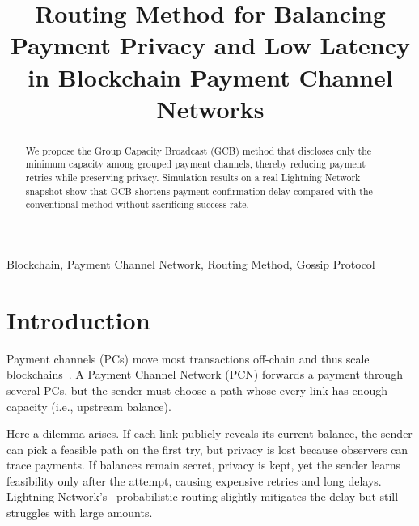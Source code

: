 \documentclass[conference]{IEEEtran}
\begin{document}
\title{Routing Method for Balancing Payment Privacy and Low Latency in Blockchain Payment Channel Networks}

\author{
	\and
}

\maketitle

\begin{abstract}
	We propose the Group Capacity Broadcast (GCB) method that discloses only the minimum capacity among grouped payment channels, thereby reducing payment retries while preserving privacy. Simulation results on a real Lightning Network snapshot show that GCB shortens payment confirmation delay compared with the conventional method without sacrificing success rate.
\end{abstract}

\begin{IEEEkeywords}
	Blockchain, Payment Channel Network, Routing Method, Gossip Protocol
\end{IEEEkeywords}

\section{Introduction}

Payment channels (PCs) move most transactions off-chain and thus scale blockchains~\cite{poon_dryja_2016}. A Payment Channel Network (PCN) forwards a payment through several PCs, but the sender must choose a path whose every link has enough capacity (i.e., upstream balance).

Here a dilemma arises.  If each link publicly reveals its current balance, the sender can pick a feasible path on the first try, but privacy is lost because observers can trace payments.  If balances remain secret, privacy is kept, yet the sender learns feasibility only after the attempt, causing expensive retries and long delays.  Lightning Network's~\cite{lnbolt} probabilistic routing slightly mitigates the delay but still struggles with large amounts.
\end{document}
